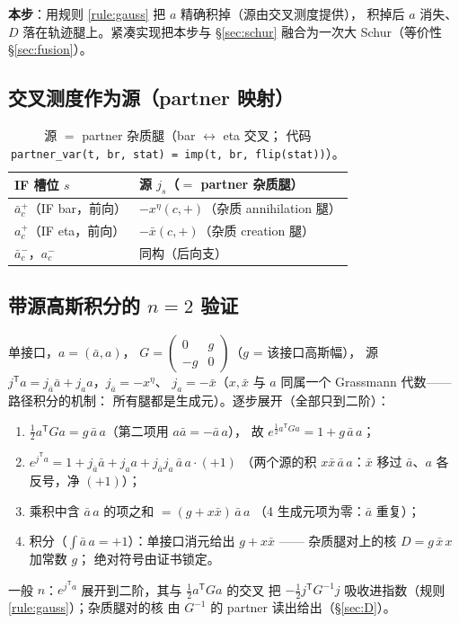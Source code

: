 \documentclass[11pt,a4paper]{ctexart}
\theoremstyle{plain}
\theoremstyle{definition}
\theoremstyle{remark}
\begin{document}
\textbf{本步}：用规则 \ref{rule:gauss} 把 $a$ 精确积掉（源由交叉测度提供），
积掉后 $a$ 消失、$D$ 落在轨迹腿上。紧凑实现把本步与 \S\ref{sec:schur}
融合为一次大 Schur（等价性 \S\ref{sec:fusion}）。

\subsection{交叉测度作为源（partner 映射）}

\begin{table}[htbp]
\centering
\begin{tabular}{ll}
\toprule
IF 槽位 $s$ & 源 $j_s$（$=$ partner 杂质腿） \\
\midrule
$\bar a_c^{+}$（IF bar，前向） & $-x^{\eta}(c,+)$（杂质 annihilation 腿） \\
$a_c^{+}$（IF eta，前向）       & $-\bar x(c,+)$（杂质 creation 腿） \\
$\bar a_c^{-}$，$a_c^{-}$       & 同构（后向支） \\
\bottomrule
\end{tabular}
\caption{源 $=$ partner 杂质腿（bar $\leftrightarrow$ eta 交叉；
代码 \texttt{partner\_var(t, br, stat) = imp(t, br, flip(stat))}）。}
\end{table}

\subsection{带源高斯积分的 \texorpdfstring{$n=2$}{n=2} 验证}\label{sec:n2}

单接口，$a = (\bar a, a)$，
$G = \begin{pmatrix} 0 & g \\ -g & 0 \end{pmatrix}$（$g$ = 该接口高斯幅），
源 $j^{\mathsf T}a = j_{\bar a}\bar a + j_a a$，$j_{\bar a} = -x^{\eta}$、
$j_a = -\bar x$（$x, \bar x$ 与 $a$ 同属一个 Grassmann 代数——路径积分的机制：
所有腿都是生成元）。逐步展开（全部只到二阶）：
\begin{enumerate}
\item $\tfrac12 a^{\mathsf T}Ga = g\,\bar a\,a$（第二项用 $a\bar a = -\bar a\,a$），
      故 $e^{\frac12 a^{\mathsf T}Ga} = 1 + g\,\bar a\,a$；
\item $e^{j^{\mathsf T}a} = 1 + j_{\bar a}\bar a + j_a a + j_{\bar a}j_a\,\bar a\,a\cdot(+1)$
      （两个源的积 $x\bar x\,\bar a\,a$：$\bar x$ 移过 $\bar a$、$a$ 各反号，净 $(+1)$）；
\item 乘积中含 $\bar a\,a$ 的项之和 $= (g + x\bar x)\,\bar a\,a$
      （4 生成元项为零：$\bar a$ 重复）；
\item 积分（$\int \bar a\,a = +1$）：单接口消元给出
      $g + x\bar x$ —— 杂质腿对上的核 $D = g\,\bar x\,x$ 加常数 $g$；
      绝对符号由证书锁定。
\end{enumerate}
一般 $n$：$e^{j^{\mathsf T}a}$ 展开到二阶，其与 $\tfrac12 a^{\mathsf T}Ga$ 的交叉
把 $-\tfrac12 j^{\mathsf T}G^{-1}j$ 吸收进指数（规则 \ref{rule:gauss}）；杂质腿对的核
由 $G^{-1}$ 的 partner 读出给出（\S\ref{sec:D}）。
\end{document}
